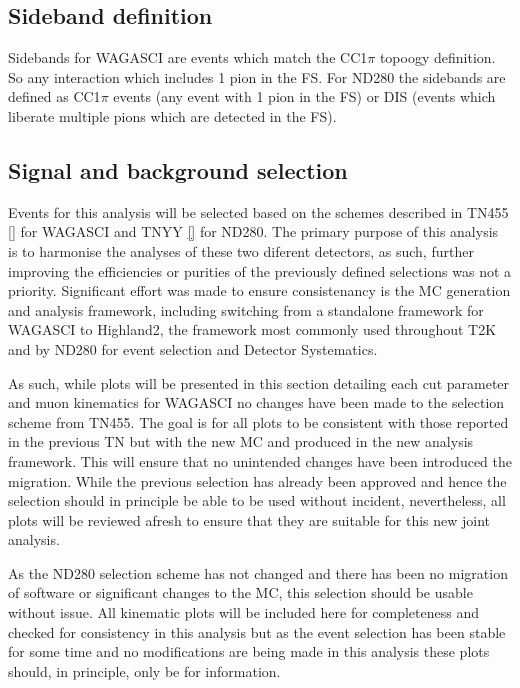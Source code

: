 \documentclass[%
 reprint,
 amsmath,amssymb,
 aps,
]{revtex4-2}
\begin{document}
\subsection{Sideband definition}
\label{sec:sideband}

Sidebands for WAGASCI are events which match the CC1$\pi$ topoogy definition. So any interaction which includes 1 pion in the FS. For ND280 the sidebands are defined as CC1$\pi$ events (any event with 1 pion in the FS) or DIS (events which liberate multiple pions which are detected in the FS).

\subsection{Signal and background selection}
\label{sec:selection}

Events for this analysis will be selected based on the schemes described in TN455 \ref{} for WAGASCI and TNYY \ref{} for ND280. The primary purpose of this analysis is to harmonise the analyses of these two diferent detectors, as such, further improving the efficiencies or purities of the previously defined selections was not a priority. Significant effort was made to ensure consistenancy is the MC generation and analysis framework, including switching from a standalone framework for WAGASCI to Highland2, the framework most commonly used throughout T2K and by ND280 for event selection and Detector Systematics. 

As such, while plots will be presented in this section detailing each cut parameter and muon kinematics for WAGASCI no changes have been made to the selection scheme from TN455. The goal is for all plots to be consistent with those reported in the previous TN but with the new MC and produced in the new analysis framework. This will ensure that no unintended changes have been introduced the migration. While the previous selection has already been approved and hence the selection should in principle be able to be used without incident, nevertheless, all plots will be reviewed afresh to ensure that they are suitable for this new joint analysis. 

As the ND280 selection scheme has not changed and there has been no migration of software or significant changes to the MC, this selection should be usable without issue. All kinematic plots will be included here for completeness and checked for consistency in this analysis but as the event selection has been stable for some time and no modifications are being made in this analysis these plots should, in principle, only be for information. 
\end{document}
